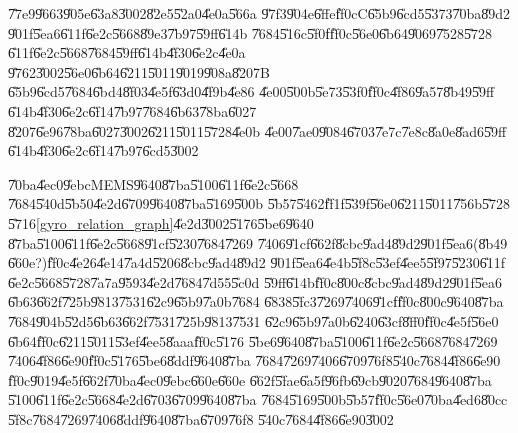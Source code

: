 \documentclass[12pt,a4paper]{article}
\begin{document}
\U{77e9}\U{9663}\U{905e}\U{63a8}\U{3002}\U{82e5}\U{52a0}\U{4e0a}\U{566a}%
\U{97f3}\U{904e}\U{6ffe}\U{ff0c}C\U{65b9}\U{6cd5}\U{5373}\U{70ba}\U{89d2}%
\U{901f}\U{5ea6}\U{611f}\U{6e2c}\U{5668}\U{89e3}\U{7b97}\U{59ff}\U{614b}%
\U{7684}\U{516c}\U{5f0f}\U{ff0c}\U{56e0}\U{6b64}\U{9069}\U{7528}\U{5728}%
\U{611f}\U{6e2c}\U{5668}\U{7684}\U{59ff}\U{614b}\U{4f30}\U{6e2c}\U{4e0a}%
\U{9762}\U{3002}\U{56e0}\U{6b64}\U{6211}\U{5011}\U{9019}\U{908a}\U{8207}B%
\U{65b9}\U{6cd5}\U{7684}\U{6bd4}\U{8f03}\U{4e5f}\U{63d0}\U{4f9b}\U{4e86}%
\U{4e00}\U{500b}\U{5e73}\U{53f0}\U{ff0c}\U{4f86}\U{9a57}\U{8b49}\U{59ff}%
\U{614b}\U{4f30}\U{6e2c}\U{6f14}\U{7b97}\U{7684}\U{6b63}\U{78ba}\U{6027}%
\U{8207}\U{6e96}\U{78ba}\U{6027}\U{3002}\U{6211}\U{5011}\U{5728}\U{4e0b}%
\U{4e00}\U{7ae0}\U{9084}\U{6703}\U{7e7c}\U{7e8c}\U{8a0e}\U{8ad6}\U{59ff}%
\U{614b}\U{4f30}\U{6e2c}\U{6f14}\U{7b97}\U{6cd5}\U{3002}

\bigskip

\U{70ba}\U{4ec0}\U{9ebc}MEMS\U{9640}\U{87ba}\U{5100}\U{611f}\U{6e2c}\U{5668}%
\U{7684}\U{540d}\U{5b50}\U{4e2d}\U{6709}\U{9640}\U{87ba}\U{5169}\U{500b}%
\U{5b57}\U{5462}\U{ff1f}\U{539f}\U{56e0}\U{6211}\U{5011}\U{756b}\U{5728}%
\U{5716}\ref{gyro_relation_graph}\U{4e2d}\U{3002}\U{5176}\U{5be6}\U{9640}%
\U{87ba}\U{5100}\U{611f}\U{6e2c}\U{5668}\U{91cf}\U{5230}\U{7684}\U{7269}%
\U{7406}\U{91cf}\U{662f}\U{8cbc}\U{9ad4}\U{89d2}\U{901f}\U{5ea6}(\U{8b49}%
\U{660e}?)\U{ff0c}\U{4e26}\U{4e14}\U{7a4d}\U{5206}\U{8cbc}\U{9ad4}\U{89d2}%
\U{901f}\U{5ea6}\U{4e4b}\U{5f8c}\U{53ef}\U{4ee5}\U{5f97}\U{5230}\U{611f}%
\U{6e2c}\U{5668}\U{5728}\U{7a7a}\U{9593}\U{4e2d}\U{7684}\U{7d55}\U{5c0d}%
\U{59ff}\U{614b}\U{ff0c}\U{800c}\U{8cbc}\U{9ad4}\U{89d2}\U{901f}\U{5ea6}%
\U{6b63}\U{662f}\U{725b}\U{9813}\U{7531}\U{62c9}\U{65b9}\U{7a0b}\U{7684}%
\U{6838}\U{5fc3}\U{7269}\U{7406}\U{91cf}\U{ff0c}\U{800c}\U{9640}\U{87ba}%
\U{7684}\U{904b}\U{52d5}\U{6b63}\U{662f}\U{7531}\U{725b}\U{9813}\U{7531}%
\U{62c9}\U{65b9}\U{7a0b}\U{6240}\U{63cf}\U{8ff0}\U{ff0c}\U{4e5f}\U{56e0}%
\U{6b64}\U{ff0c}\U{6211}\U{5011}\U{53ef}\U{4ee5}\U{8aaa}\U{ff0c}\U{5176}%
\U{5be6}\U{9640}\U{87ba}\U{5100}\U{611f}\U{6e2c}\U{5668}\U{7684}\U{7269}%
\U{7406}\U{4f86}\U{6e90}\U{ff0c}\U{5176}\U{5be6}\U{8ddf}\U{9640}\U{87ba}%
\U{7684}\U{7269}\U{7406}\U{6709}\U{76f8}\U{540c}\U{7684}\U{4f86}\U{6e90}%
\U{ff0c}\U{9019}\U{4e5f}\U{662f}\U{70ba}\U{4ec0}\U{9ebc}\U{660e}\U{660e}%
\U{662f}\U{5fae}\U{6a5f}\U{96fb}\U{69cb}\U{9020}\U{7684}\U{9640}\U{87ba}%
\U{5100}\U{611f}\U{6e2c}\U{5668}\U{4e2d}\U{6703}\U{6709}\U{9640}\U{87ba}%
\U{7684}\U{5169}\U{500b}\U{5b57}\U{ff0c}\U{56e0}\U{70ba}\U{4ed6}\U{80cc}%
\U{5f8c}\U{7684}\U{7269}\U{7406}\U{8ddf}\U{9640}\U{87ba}\U{6709}\U{76f8}%
\U{540c}\U{7684}\U{4f86}\U{6e90}\U{3002}
\end{document}
